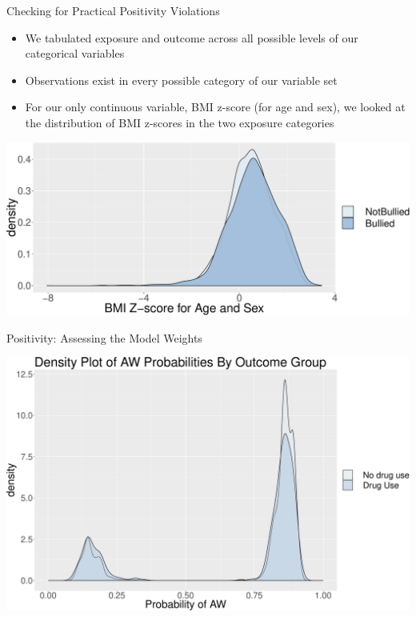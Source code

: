 \documentclass[ignorenonframetext,]{beamer}
\begin{document}
\begin{frame}{Checking for Practical Positivity Violations}

\begin{itemize}
\item
  We tabulated exposure and outcome across all possible levels of our
  categorical variables
\item
  Observations exist in every possible category of our variable set
\item
  For our only continuous variable, BMI z-score (for age and sex), we
  looked at the distribution of BMI z-scores in the two exposure
  categories
\end{itemize}

\includegraphics{Final_Project_Coding_files/figure-beamer/unnamed-chunk-2-1.pdf}

\end{frame}

\begin{frame}{Positivity: Assessing the Model Weights}

\includegraphics{Final_Project_Coding_files/figure-beamer/unnamed-chunk-3-1.pdf}

\end{frame}
\end{document}
